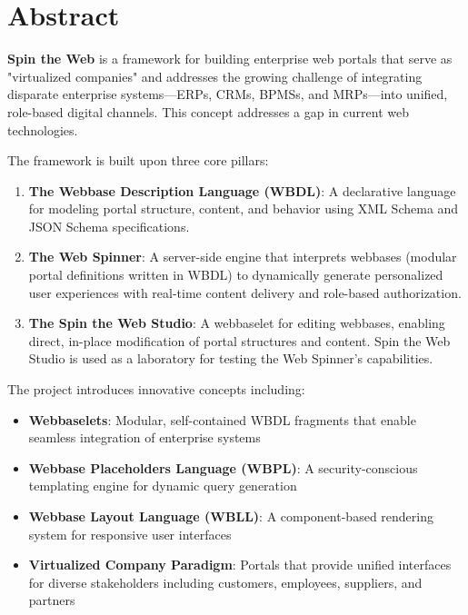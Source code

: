 
\chapter*{Abstract}

\textbf{Spin the Web} is a framework for building enterprise web portals that serve as "virtualized companies" and addresses the growing challenge of integrating disparate enterprise systems—ERPs, CRMs, BPMSs, and MRPs—into unified, role-based digital channels. This concept addresses a gap in current web technologies.

The framework is built upon three core pillars:

\begin{enumerate}
\item \textbf{The Webbase Description Language (WBDL)}: A declarative language for modeling portal structure, content, and behavior using XML Schema and JSON Schema specifications.

\item \textbf{The Web Spinner}: A server-side engine that interprets webbases (modular portal definitions written in WBDL) to dynamically generate personalized user experiences with real-time content delivery and role-based authorization.

\item \textbf{The Spin the Web Studio}: A webbaselet for editing webbases, enabling direct, in-place modification of portal structures and content. Spin the Web Studio is used as a laboratory for testing the Web Spinner's capabilities.
\end{enumerate}

The project introduces innovative concepts including:
\begin{itemize}
\item \textbf{Webbaselets}: Modular, self-contained WBDL fragments that enable seamless integration of enterprise systems
\item \textbf{Webbase Placeholders Language (WBPL)}: A security-conscious templating engine for dynamic query generation
\item \textbf{Webbase Layout Language (WBLL)}: A component-based rendering system for responsive user interfaces
\item \textbf{Virtualized Company Paradigm}: Portals that provide unified interfaces for diverse stakeholders including customers, employees, suppliers, and partners
\end{itemize}

